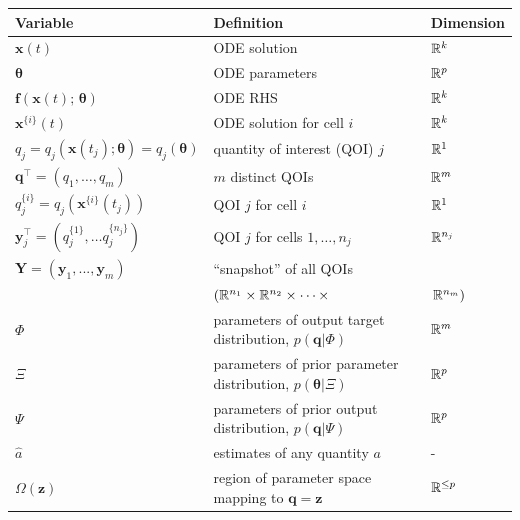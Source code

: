 \begin{table}[htbp]
\centering
\begin{adjustwidth}{-0.6in}{0in}%
\begin{tabularx}{1.2\textwidth}{lll}
Variable	                                                & Definition                                   & Dimension \\
\toprule
$\boldsymbol{x}(t)$                                     	& ODE solution                                 & $\mathbb{R}^k$ \\
$\boldsymbol{\theta}$                                     	& ODE parameters                               & $\mathbb{R}^p$ \\
$\boldsymbol{f}(\boldsymbol{x}(t); \, \boldsymbol{\theta})$	& ODE RHS                                      & $\mathbb{R}^k$ \\
$\boldsymbol{x}^{\{i\}}(t)$                                 & ODE solution for cell $i$                    & $\mathbb{R}^k$ \\
$q_j= q_j(\boldsymbol{x}(t_j);\boldsymbol{\theta}) = q_j(\boldsymbol{\theta})$                             & quantity of interest (QOI) $j$               & $\mathbb{R}^1$ \\
$\boldsymbol{q}^\top= \left( q_1, \dots, q_m \right)$       & $m$ distinct QOIs                            & $\mathbb{R}^m$ \\
$q_j^{\{i\}}= q_j(\boldsymbol{x}^{\{i\}}(t_j))$             & QOI $j$ for cell $i$                         & $\mathbb{R}^1$ \\
$\boldsymbol{y}_j^\top=\left( q_j^{\{1\}}, \dots q_j^{\{n_j\}} \right)$  & QOI $j$ for cells $1, \dots, n_j$    & $\mathbb{R}^{n_j}$ \\
$\boldsymbol{Y}=(\boldsymbol{y}_1,...,\boldsymbol{y}_m)$    & ``snapshot'' of all QOIs   & \\
& \hfill $\left( \mathbb{R}^{n_1} \times \mathbb{R}^{n_2}\times \dots \times \right.$ & $\left. \mathbb{R}^{n_m} \right)$ \\
$\Phi$ & parameters of output target distribution, $p(\boldsymbol{q}|\Phi)$              & $\mathbb{R}^m$ \\
$\Xi$  & parameters of prior parameter distribution, $p(\boldsymbol{\theta}|\Xi)$        & $\mathbb{R}^p$ \\
$\Psi$ & parameters of prior output distribution, $p(\boldsymbol{q}|\Psi)$               & $\mathbb{R}^p$ \\
$\hat{a}$ & estimates of any quantity $a$                                                                  & - \\
$\Omega(\boldsymbol{z})$              & region of parameter space mapping to $\boldsymbol{q}=\boldsymbol{z}$         & $\mathbb{R}^{\leq p}$ \\

\end{tabularx}
\end{adjustwidth}
\end{table}
